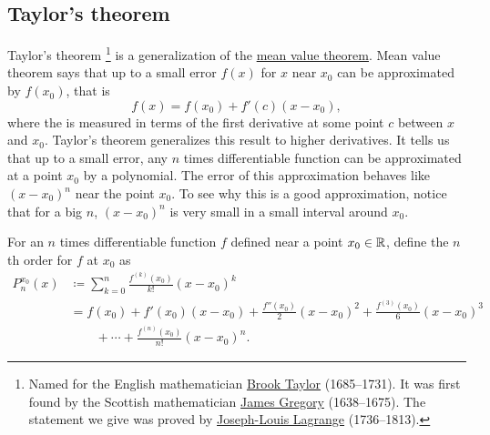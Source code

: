 \subsection{Taylor's theorem}

Taylor's theorem%
\footnote{Named for the English mathematician
\href{https://en.wikipedia.org/wiki/Brook_Taylor}{Brook Taylor}
(1685--1731).
It was first found by
the Scottish mathematician
\href{https://en.wikipedia.org/wiki/James_Gregory_(mathematician)}{James Gregory}
(1638--1675).  The statement we give
was proved by
\href{https://en.wikipedia.org/wiki/Lagrange}{Joseph-Louis Lagrange}
(1736--1813).}
is a generalization of the \hyperref[thm:mvt]{mean value theorem}.
Mean value theorem says that up to a small error $f(x)$ for $x$ near $x_0$ can be
approximated by $f(x_0)$, that is
\begin{equation*}
f(x) = f(x_0) + f'(c)(x-x_0),
\end{equation*}
where the  is measured in terms of the first derivative
at some point $c$ between $x$ and $x_0$.
Taylor's theorem generalizes this result to higher derivatives.
It tells us that up to a small error, any $n$
times differentiable function can be approximated at a point $x_0$
by a polynomial.  The
error of this approximation behaves like ${(x-x_0)}^{n}$ near the point $x_0$.
To see why this is a good approximation, notice that for a big $n$, 
${(x-x_0)}^n$ is very small in a small interval around $x_0$.

\begin{defn}
For an $n$ times differentiable function $f$ defined near a point $x_0 \in {\mathbb{R}}$, define the
$n$th order \emph{}%
for $f$ at $x_0$ as
\begin{equation*}
\begin{split}
P_n^{x_0}(x)
& \coloneqq
\sum_{k=0}^n
\frac{f^{(k)}(x_0)}{k!}{(x-x_0)}^k
\\
& =
f(x_0)
+ f'(x_0)(x-x_0)
+ \frac{f''(x_0)}{2}{(x-x_0)}^2
+ \frac{f^{(3)}(x_0)}{6}{(x-x_0)}^3
\\
& \qquad
+ \cdots
+ \frac{f^{(n)}(x_0)}{n!}{(x-x_0)}^n .
\end{split}
\end{equation*}
\end{defn}

